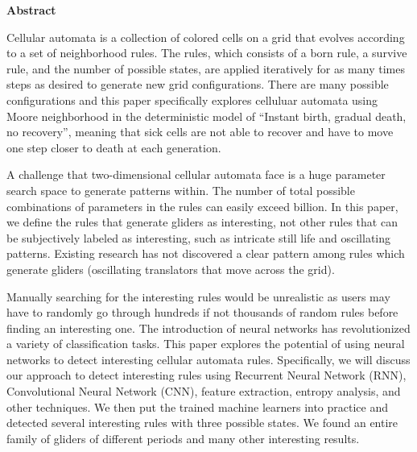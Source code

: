 \documentclass[12pt]{article}
\numberwithin{figure}{section} %
\begin{document}
\thispagestyle{plain}
\begin{center}
\Large
\textbf{Abstract}
\end{center}
Cellular automata is a collection of colored cells on a grid that evolves according to a set of neighborhood rules. The rules, which consists of a born rule, a survive rule, and the number of possible states, are applied iteratively for as many times steps as desired to generate new grid configurations. There are many possible configurations and this paper specifically explores celluluar automata using Moore neighborhood in the deterministic model of “Instant birth, gradual death, no recovery”, meaning that sick cells are not able to recover and have to move one step closer to death at each generation. 

A challenge that two-dimensional cellular automata face is a huge parameter search space to generate patterns within. The number of total possible combinations of parameters in the rules can easily exceed billion. In this paper, we define the rules that generate gliders as interesting, not other rules that can be subjectively labeled as interesting, such as intricate still life and oscillating patterns. Existing research has not discovered a clear pattern among rules which generate gliders (oscillating translators that move across the grid). 

Manually searching for the interesting rules would be unrealistic as users may have to randomly go through hundreds if not thousands of random rules before finding an interesting one. The introduction of neural networks has revolutionized a variety of classification tasks. This paper explores the potential of using neural networks to detect interesting cellular automata rules. Specifically, we will discuss our approach to detect interesting rules using Recurrent Neural Network (RNN), Convolutional Neural Network (CNN), feature extraction, entropy analysis, and other techniques. We then put the trained machine learners into practice and detected several interesting rules with three possible states. We found an entire family of gliders of different periods and many other interesting results. 
\end{document}

